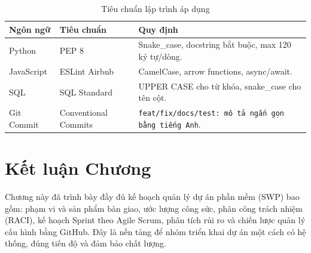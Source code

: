 \begin{table}[H]
  \centering
  \caption{Tiêu chuẩn lập trình áp dụng}
  \label{tab:coding-standards}
  \renewcommand{\arraystretch}{1.4}
  \begin{tabularx}{\textwidth}{|l|l|X|}
    \hline
    \rowcolor{blue!10}
    \textbf{Ngôn ngữ} & \textbf{Tiêu chuẩn} & \textbf{Quy định} \\
    \hline
    Python & PEP 8 & Snake\_case, docstring bắt buộc, max 120 ký tự/dòng. \\
    \hline
    JavaScript & ESLint Airbnb & CamelCase, arrow functions, async/await. \\
    \hline
    SQL & SQL Standard & UPPER CASE cho từ khóa, snake\_case cho tên cột. \\
    \hline
    Git Commit & Conventional Commits & \texttt{feat/fix/docs/test: mô tả ngắn gọn bằng tiếng Anh}. \\
    \hline
  \end{tabularx}
\end{table}

\section{Kết luận Chương}

Chương này đã trình bày đầy đủ kế hoạch quản lý dự án phần mềm (SWP) bao gồm: phạm vi và sản phẩm bàn giao, ước lượng công sức, phân công trách nhiệm (RACI), kế hoạch Sprint theo Agile Scrum, phân tích rủi ro và chiến lược quản lý cấu hình bằng GitHub. Đây là nền tảng để nhóm triển khai dự án một cách có hệ thống, đúng tiến độ và đảm bảo chất lượng.
